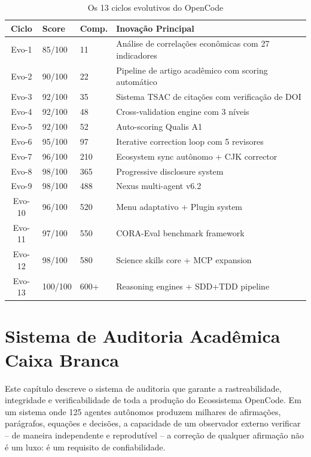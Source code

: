 \documentclass[12pt,a4paper,sumario=tradicional,openany]{abntex2}
\begin{document}
\begin{table}[H]
\centering
\caption{Os 13 ciclos evolutivos do OpenCode}
\label{tab:evolution}
\begin{tabular}{@{}cllp{5cm}@{}}
\toprule
\textbf{Ciclo} & \textbf{Score} & \textbf{Comp.} & \textbf{Inovação Principal} \\
\midrule
Evo-1 & 85/100 & 11 & Análise de correlações econômicas com 27 indicadores \\
Evo-2 & 90/100 & 22 & Pipeline de artigo acadêmico com scoring automático \\
Evo-3 & 92/100 & 35 & Sistema TSAC de citações com verificação de DOI \\
Evo-4 & 92/100 & 48 & Cross-validation engine com 3 níveis \\
Evo-5 & 92/100 & 52 & Auto-scoring Qualis A1 \\
Evo-6 & 95/100 & 97 & Iterative correction loop com 5 revisores \\
Evo-7 & 96/100 & 210 & Ecosystem sync autônomo + CJK corrector \\
Evo-8 & 98/100 & 365 & Progressive disclosure system \\
Evo-9 & 98/100 & 488 & Nexus multi-agent v6.2 \\
Evo-10 & 96/100 & 520 & Menu adaptativo + Plugin system \\
Evo-11 & 97/100 & 550 & CORA-Eval benchmark framework \\
Evo-12 & 98/100 & 580 & Science skills core + MCP expansion \\
Evo-13 & 100/100 & 600+ & Reasoning engines + SDD+TDD pipeline \\
\bottomrule
\end{tabular}
\end{table}

\chapter{Sistema de Auditoria Acadêmica Caixa Branca}

Este capítulo descreve o sistema de auditoria que garante a rastreabilidade, integridade e verificabilidade de toda a produção do Ecossistema OpenCode. Em um sistema onde 125 agentes autônomos produzem milhares de afirmações, parágrafos, equações e decisões, a capacidade de um observador externo verificar -- de maneira independente e reprodutível -- a correção de qualquer afirmação não é um luxo: é um requisito de confiabilidade.
\end{document}
